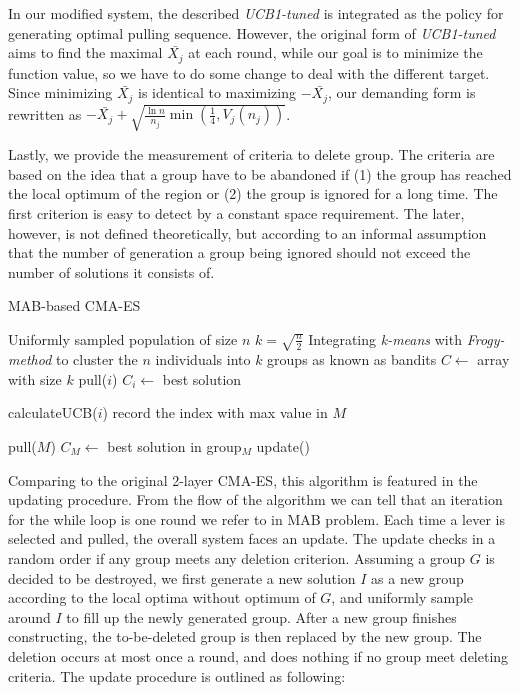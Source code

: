 In our modified system, the described \emph{UCB1-tuned} is integrated as
the policy for generating optimal pulling sequence.
However, the original form of \emph{UCB1-tuned} aims to find the maximal
$\bar{X_j}$ at each round, while our goal is to minimize the function
value, so we have to do some change to deal with the different target.
Since minimizing $\bar{X_j}$ is identical to maximizing $-\bar{X_j}$,
our demanding form is rewritten as $ -\bar{X_j}
+\sqrt{\frac{\ln{n}}{n_j} \min(\frac{1}{4},V_j(n_j))}$.		

Lastly, we provide the measurement of criteria to delete group.
The criteria are based on the idea that a group have to be abandoned if
(1) the group has reached the local optimum of the region or (2) the group
is ignored for a long time.
The first criterion is easy to detect by a constant space requirement.
The later, however, is not defined theoretically, but according to an
informal assumption that the number of generation a group being ignored
should not exceed the number of solutions it consists of.




\begin{algorithm}[H] \caption{MAB-based CMA-ES} 
	 Uniformly sampled population of
	size $n$\; $k = \sqrt{\frac{n}{2}}$\; Integrating \emph{k-means}
	with \emph{Frogy-method} to cluster the $n$ individuals into $k$
	groups as known as bandits\; $C\leftarrow$ array with size $k$\;
	            { pull($i$)\; $C_i\leftarrow$ best
	solution\; }  {  {
			calculateUCB($i$)  record the index with max value in $M$\;

		} pull($M$)\;				$C_M \leftarrow$ best solution in
	group$_M$\; update()\; }
\end{algorithm}	

Comparing to the original 2-layer CMA-ES, this algorithm is featured in
the updating procedure.
From the flow of the algorithm we can tell that an iteration for the while
loop is one round we refer to in MAB problem.
Each time a lever is selected and pulled, the overall system faces an
update.
The update checks in a random order if any group meets any deletion
criterion.
Assuming a group $G$ is decided to be destroyed, we first generate a new
solution $I$ as a new group according to the local optima without
optimum of $G$, and uniformly sample around $I$ to fill up the newly
generated group.
After a new group finishes constructing, the to-be-deleted group is then
replaced by the new group.
The deletion occurs at most once a round, and does nothing if no group
meet deleting criteria.
The update procedure is outlined as following:

